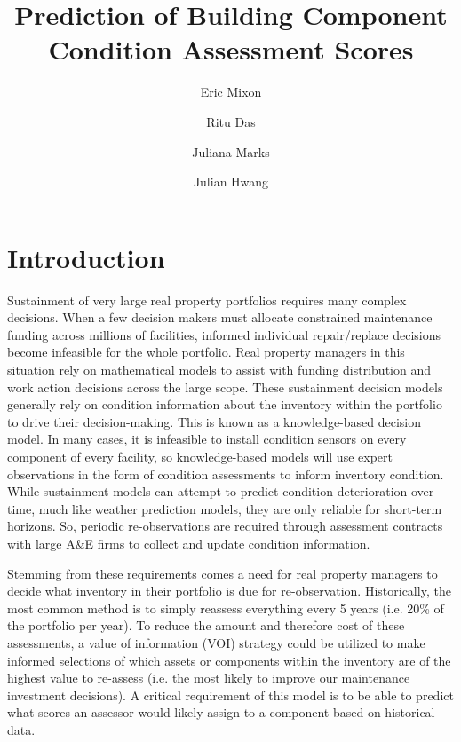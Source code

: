 \documentclass[NewProceedings,letterpaper,NoPageNumbers]{ascelike-new}
\begin{document}
\title{Prediction of Building Component Condition Assessment Scores}

\author[1]{Eric Mixon}
\author[2]{Ritu Das}
\author[3]{Juliana Marks}
\author[4]{Julian Hwang}

\maketitle

\section{Introduction}

Sustainment of very large real property portfolios requires many complex decisions. When a few decision makers must allocate constrained maintenance funding across millions of facilities, informed individual repair/replace decisions become infeasible for the whole portfolio. Real property managers in this situation rely on mathematical models to assist with funding distribution and work action decisions across the large scope.  These sustainment decision models generally rely on condition information about the inventory within the portfolio to drive their decision-making. This is known as a knowledge-based decision model.  In many cases, it is infeasible to install condition sensors on every component of every facility, so knowledge-based models will use expert observations in the form of condition assessments to inform inventory condition.  While sustainment models can attempt to predict condition deterioration over time, much like weather prediction models, they are only reliable for short-term horizons. So, periodic re-observations are required through assessment contracts with large A\&E firms to collect and update condition information.  

Stemming from these requirements comes a need for real property managers to decide what inventory in their portfolio is due for re-observation.  Historically, the most common method is to simply reassess everything every 5 years (i.e. 20\% of the portfolio per year).  To reduce the amount and therefore cost of these assessments, a value of information (VOI) strategy could be utilized to make informed selections of which assets or components within the inventory are of the highest value to re-assess (i.e. the most likely to improve our maintenance investment decisions).  A critical requirement of this model is to be able to predict what scores an assessor would likely assign to a component based on historical data. 
\end{document}
